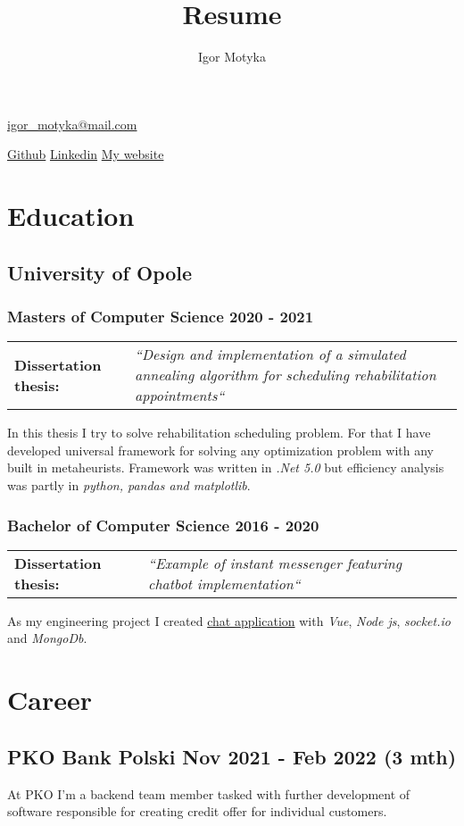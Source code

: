 \documentclass[10pt]{article}
\author{Igor Motyka}
\title{Resume}
\makeatletter
\renewcommand{\maketitle}{
 \begin{center}
    \huge\bfseries\theauthor
 \end{center}
 \begin{center}
    \href{mailto:igor\_motyka@mail.com}{igor\_motyka@mail.com}\\
 \end{center}
 \begin{center}
	 \href{https://github.com/Anav0}{Github} \hspace{0.7cm} \href{https://www.linkedin.com/in/igor-m-873439168/}{Linkedin} \hspace{0.7cm} \href{https://igormotyka.netlify.app/}{My website}
 \end{center}
 }
\makeatother
\begin{document}
\maketitle

\section{Education}
\subsection{University of Opole}
\subsubsection{Masters of Computer Science 2020 - 2021}
\begin{table}[H]
    \begin{tabularx}{\textwidth}{@{}l X}
     \textbf{Dissertation thesis:} & \textit{``Design and implementation of a simulated annealing algorithm for scheduling rehabilitation appointments``} \\
    \end{tabularx}
\end{table}
\noindent In this thesis I try to solve rehabilitation scheduling problem. For that I have developed universal framework for solving any optimization problem with any built in metaheurists. Framework was written in \emph{.Net 5.0} but efficiency analysis was partly in \emph{python, pandas and matplotlib}.
\subsubsection{Bachelor of Computer Science 2016 - 2020}
\begin{table}[H]
    \begin{tabularx}{\textwidth}{@{}l X}
    \textbf{Dissertation thesis:} &  \textit{``Example of instant messenger featuring chatbot implementation``}\\
    \end{tabularx}
\end{table}
\noindent As my engineering project I created \href{https://www.behance.net/gallery/91600605/Gymba-chat}{chat application} with \emph{Vue}, \emph{Node js}, \emph{socket.io} and \emph{MongoDb}.
\section{Career}
\subsection{PKO Bank Polski Nov 2021 - Feb 2022 (3 mth)}
At PKO I'm a backend team member tasked with further development of software responsible for creating credit offer for individual customers.
\end{document}
